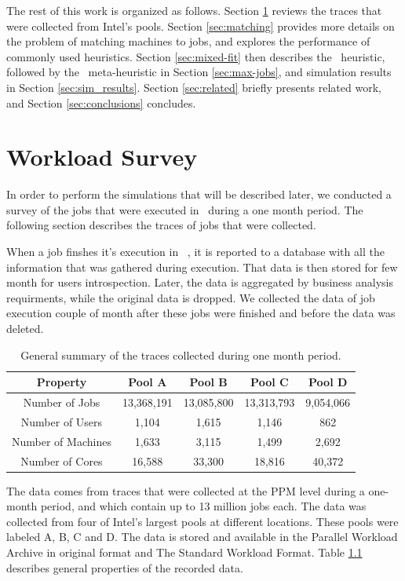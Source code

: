 The rest of this work is organized as follows.
Section \ref{sec:traces} reviews the traces that were collected from Intel's pools.
Section \ref{sec:matching} provides more details on the problem of
matching machines to jobs, and explores the performance of commonly
used heuristics.
Section \ref{sec:mixed-fit} then describes the \mif\ heuristic,
followed by the \maj\ meta-heuristic in Section \ref{sec:max-jobs},
and simulation results in Section \ref{sec:sim_results}.
Section \ref{sec:related} briefly presents related work, and Section
\ref{sec:conclusions} concludes.

\chapter{Workload Survey}
\label{sec:traces}
In order to perform the simulations that will be described later, 
we conducted a survey of the jobs that were executed in \nb\ during a one month period.
The following section describes the traces of jobs that were collected.

When a job finshes it's execution in \nb\ , it is reported to a database 
with all the information that was gathered during execution.
That data is then stored for few month for users introspection. Later, the data is 
aggregated by business analysis requirments, while the original data is dropped.
We collected the data of job execution couple of month after these jobs were finished 
and before the data was deleted.

\begin{table}\centering
\begin{tabular}{|c|c|c|c|c|}

\hline 
Property & Pool A & Pool B & Pool C & Pool D\tabularnewline
\hline 
Number of Jobs & 13,368,191 & 13,085,800 & 13,313,793 & 9,054,066\tabularnewline
\hline 
Number of Users & 1,104 & 1,615 & 1,146 & 862\tabularnewline
\hline 
Number of Machines & 1,633 & 3,115 & 1,499 & 2,692\tabularnewline
\hline 
Number of Cores & 16,588 & 33,300 & 18,816 & 40,372\tabularnewline
\hline 
\end{tabular}
\caption{General summary of the traces collected during one month period.}
\label{tab:jobs_properties}
\end{table}

The data comes from traces that were collected at the PPM
level during a one-month period, and which contain up to 13 million jobs each.
The data was collected from four of Intel's largest pools at different locations. 
These pools were labeled A, B, C and D.
The data is stored and available in the Parallel Workload Archive \cite{parallel13} in original format and The Standard Workload Format\cite{swf1}.
Table \ref{tab:jobs_properties} describes general properties of the recorded data.

